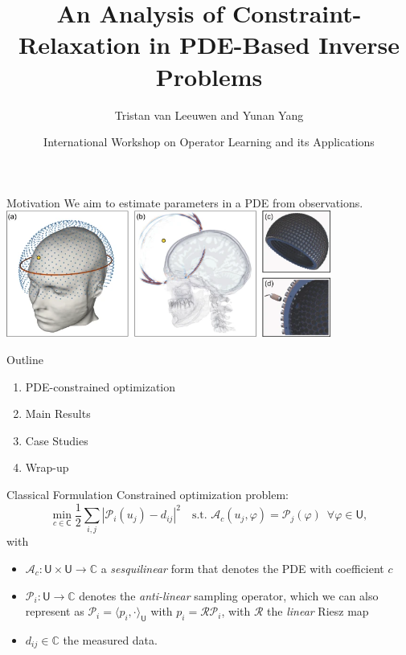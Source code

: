 \documentclass{beamer}
\title[Constraint-Relaxation in PDE Inverse Problems]{An Analysis of Constraint-Relaxation in PDE-Based Inverse Problems}
\author{Tristan van Leeuwen and Yunan Yang}
\date{International Workshop on Operator Learning and its Applications}
\newcommand{\sU}{\mathsf{U}}
\newcommand{\sC}{\mathsf{C}}
\newcommand{\mA}{\mathcal{A}}
\newcommand{\mP}{\mathcal{P}}
\newcommand{\mR}{\mathcal{R}}
\begin{document}
\begin{frame}
  \titlepage
\end{frame}

\begin{frame}{Motivation}
We aim to estimate parameters in a PDE from observations.
\\[1cm]
\centering
\includegraphics[width=0.8\textwidth]{./figs/medical.png}

\cite{guasch2020full}

\end{frame}


\begin{frame}{Outline}
\begin{enumerate}
  \item PDE-constrained optimization
  \item Main Results
  \item Case Studies
  \item Wrap-up
\end{enumerate}
\end{frame}

\begin{frame}{Classical Formulation}
Constrained optimization problem:
\begin{equation*}
\min_{c\in\sC} \frac{1}{2} \sum_{i,j} |\mP_i(u_j) - d_{ij}|^2 \quad \text{s.t. } \mA_c(u_j, \varphi) = \mP_j(\varphi) \,\,\, \forall \varphi \in \sU,
\end{equation*}
with
\begin{itemize}
  \item $\mA_c: \sU\times \sU \rightarrow \mathbb{C}$ a \emph{sesquilinear} form that denotes the PDE with coefficient $c$
  \item $\mP_i : \sU \rightarrow \mathbb{C}$ denotes the \emph{anti-linear} sampling operator, which we can also represent as $\mP_i = \langle p_i,\cdot \rangle_\sU$ with $p_i = \mR \mP_i$, with $\mR$ the \emph{linear} Riesz map
  \item $d_{ij} \in \mathbb{C}$ the measured data. 
\end{itemize}
\end{frame}
\end{document}
